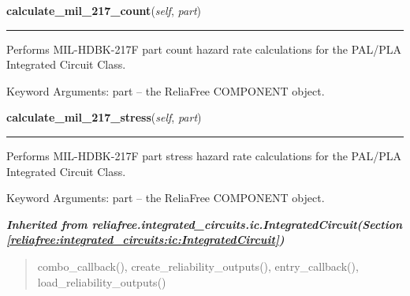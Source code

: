     \label{reliafree:integrated_circuits:palpla:PALPLA:calculate_mil_217_count}

    \vspace{0.5ex}

\hspace{.8\funcindent}\begin{boxedminipage}{\funcwidth}

    \raggedright \textbf{calculate\_mil\_217\_count}(\textit{self}, \textit{part})

    \vspace{-1.5ex}

    \rule{\textwidth}{0.5\fboxrule}
\setlength{\parskip}{2ex}
    Performs MIL-HDBK-217F part count hazard rate calculations for the 
    PAL/PLA Integrated Circuit Class.

    Keyword Arguments: part -- the ReliaFree COMPONENT object.

\setlength{\parskip}{1ex}
    \end{boxedminipage}

    \label{reliafree:integrated_circuits:palpla:PALPLA:calculate_mil_217_stress}

    \vspace{0.5ex}

\hspace{.8\funcindent}\begin{boxedminipage}{\funcwidth}

    \raggedright \textbf{calculate\_mil\_217\_stress}(\textit{self}, \textit{part})

    \vspace{-1.5ex}

    \rule{\textwidth}{0.5\fboxrule}
\setlength{\parskip}{2ex}
    Performs MIL-HDBK-217F part stress hazard rate calculations for the 
    PAL/PLA Integrated Circuit Class.

    Keyword Arguments: part -- the ReliaFree COMPONENT object.

\setlength{\parskip}{1ex}
    \end{boxedminipage}


\large{\textbf{\textit{Inherited from reliafree.integrated\_circuits.ic.IntegratedCircuit\textit{(Section \ref{reliafree:integrated_circuits:ic:IntegratedCircuit})}}}}

\begin{quote}
combo\_callback(), create\_reliability\_outputs(), entry\_callback(), load\_reliability\_outputs()
\end{quote}
